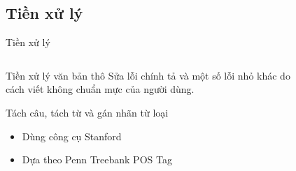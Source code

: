 \documentclass[9pt,xcolor=table,hyperref=unicode]{beamer}
\begin{document}
	\subsection{Tiền xử lý}	
	\begin{frame}{Tiền xử lý}		
		\begin{columns}[t]
			\begin{column}{0.7\textwidth}				
			   	\begin{block}{Tiền xử lý văn bản thô}
	   				Sửa lỗi chính tả và một số lỗi nhỏ khác do cách viết không chuẩn mực của người dùng.
				\end{block}
				\begin{block}{Tách câu, tách từ và gán nhãn từ loại}
					\begin{itemize}			   		
		   				\item{Dùng công cụ Stanford \footnotemark}
		   				\item{Dựa theo Penn Treebank POS Tag \footnotemark}
		   			\end{itemize}
				\end{block}
			\end{column}
			\begin{column}{0.3\textwidth}  %
			 	\begin{figure}[H]
					\fontsize{13pt}{13}\selectfont 
					\centering				
					\resizebox{20mm}{!}{}	
				\end{figure}				
			\end{column}
		\end{columns}
		\begin{columns}[t]			
			\begin{column}{\textwidth}				
			   	\begin{figure}[H]
					\LARGE 
					\resizebox{100mm}{!}{}										
				\end{figure}
			\end{column}			
		\end{columns}
	\end{frame}
\end{document}

